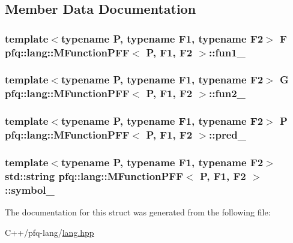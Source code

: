 \subsection{Member Data Documentation}
\hypertarget{structpfq_1_1lang_1_1MFunctionPFF_a7493c23483456135e4b6e87a1da287b1}{
\subsubsection[{fun1\+\_\+}]{\setlength{\rightskip}{0pt plus 5cm}template$<$typename P, typename F1, typename F2$>$ F {\bf pfq\+::lang\+::\+M\+Function\+P\+F\+F}$<$ P, F1, F2 $>$\+::fun1\+\_\+}}\label{structpfq_1_1lang_1_1MFunctionPFF_a7493c23483456135e4b6e87a1da287b1}
\hypertarget{structpfq_1_1lang_1_1MFunctionPFF_a81926e88edcadc9145f773fbba260b1a}{
\subsubsection[{fun2\+\_\+}]{\setlength{\rightskip}{0pt plus 5cm}template$<$typename P, typename F1, typename F2$>$ G {\bf pfq\+::lang\+::\+M\+Function\+P\+F\+F}$<$ P, F1, F2 $>$\+::fun2\+\_\+}}\label{structpfq_1_1lang_1_1MFunctionPFF_a81926e88edcadc9145f773fbba260b1a}
\hypertarget{structpfq_1_1lang_1_1MFunctionPFF_a345690a131a4445a14b5e26f2e3db4cf}{
\subsubsection[{pred\+\_\+}]{\setlength{\rightskip}{0pt plus 5cm}template$<$typename P, typename F1, typename F2$>$ P {\bf pfq\+::lang\+::\+M\+Function\+P\+F\+F}$<$ P, F1, F2 $>$\+::pred\+\_\+}}\label{structpfq_1_1lang_1_1MFunctionPFF_a345690a131a4445a14b5e26f2e3db4cf}
\hypertarget{structpfq_1_1lang_1_1MFunctionPFF_a6685526768fbc7966bb1a0785b88546d}{
\subsubsection[{symbol\+\_\+}]{\setlength{\rightskip}{0pt plus 5cm}template$<$typename P, typename F1, typename F2$>$ std\+::string {\bf pfq\+::lang\+::\+M\+Function\+P\+F\+F}$<$ P, F1, F2 $>$\+::symbol\+\_\+}}\label{structpfq_1_1lang_1_1MFunctionPFF_a6685526768fbc7966bb1a0785b88546d}


The documentation for this struct was generated from the following file\+:\begin{DoxyCompactItemize}
\item 
C++/pfq-\/lang/\hyperlink{lang_8hpp}{lang.\+hpp}\end{DoxyCompactItemize}
